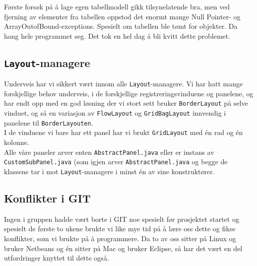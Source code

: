 Første forsøk på å lage egen tabellmodell gikk tilsynelatende bra, men ved fjerning av elementer fra tabellen oppstod det enormt mange Null Pointer- og ArrayOutofBound-exceptions. Spesielt om tabellen ble tømt for objekter. Da hang hele programmet seg. Det tok en hel dag å bli kvitt dette problemet. 
\subsection{\texttt{Layout}-managere}
Underveis har vi sikkert vært innom alle \texttt{Layout}-managere. Vi har hatt mange forskjellige behov underveis, i de forskjellige registreringsvinduene og panelene, og har endt opp med en god løsning der vi stort sett bruker \texttt{BorderLayout} på selve vinduet, og så en variasjon av \texttt{FlowLayout} og \texttt{GridBagLayout} innvendig i panelene til \texttt{BorderLayouten}. \\
I de vinduene vi bare har ett panel har vi brukt \texttt{GridLayout} med én rad og én kolonne. \\
Alle våre paneler arver enten \texttt{AbstractPanel.java} eller er instans av \texttt{CustomSubPanel.java} (som igjen arver \texttt{AbstractPanel.java} og begge de klassene tar i mot \texttt{Layout}-managere i minst én av sine konstruktører.

\subsection{Konflikter i GIT}
Ingen i gruppen hadde vært borte i GIT noe spesielt før prosjektet startet og spesielt de første to ukene brukte vi like mye tid på å lære oss dette og fikse konflikter, som vi brukte på å programmere. Da to av oss sitter på Linux og bruker Netbeans og én sitter på Mac og bruker Eclipse, så har det vært en del utfordringer knyttet til dette også.


